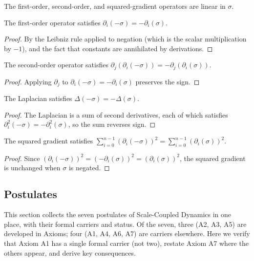 The first-order, second-order, and squared-gradient operators are linear in $\sigma$.

\begin{theorem}
The first-order operator satisfies $\partial_i(-\sigma) = -\partial_i(\sigma)$.
\end{theorem}
\begin{proof}
By the Leibniz rule applied to negation (which is the scalar multiplication by $-1$), and the fact that constants are annihilated by derivations.
\end{proof}

\begin{theorem}
The second-order operator satisfies $\partial_j(\partial_i(-\sigma)) = -\partial_j(\partial_i(\sigma))$.
\end{theorem}
\begin{proof}
Applying $\partial_j$ to $\partial_i(-\sigma) = -\partial_i(\sigma)$ preserves the sign.
\end{proof}

\begin{theorem}
The Laplacian satisfies $\Delta(-\sigma) = -\Delta(\sigma)$.
\end{theorem}
\begin{proof}
The Laplacian is a sum of second derivatives, each of which satisfies $\partial_i^2(-\sigma) = -\partial_i^2(\sigma)$, so the sum reverses sign.
\end{proof}

\begin{theorem}
The squared gradient satisfies $\sum_{i=0}^{n-1} (\partial_i(-\sigma))^2 = \sum_{i=0}^{n-1} (\partial_i(\sigma))^2$.
\end{theorem}
\begin{proof}
Since $(\partial_i(-\sigma))^2 = (-\partial_i(\sigma))^2 = (\partial_i(\sigma))^2$, the squared gradient is unchanged when $\sigma$ is negated.
\end{proof}

\subsection{Postulates}

This section collects the seven postulates of Scale-Coupled Dynamics in one place, with their formal carriers and status. Of the seven, three (A2, A3, A5) are developed in Axioms; four (A1, A4, A6, A7) are carriers elsewhere. Here we verify that Axiom A1 has a single formal carrier (not two), restate Axiom A7 where the others appear, and derive key consequences.

